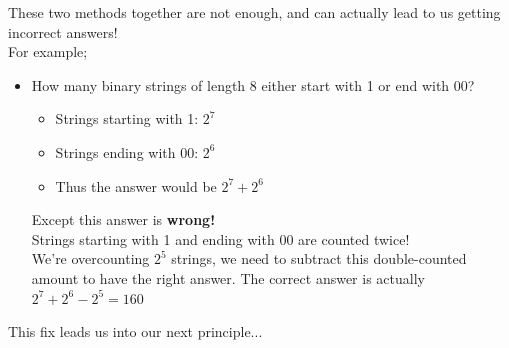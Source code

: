 \documentclass[12pt, letterpaper]{article}
\begin{document}
These two methods together are not enough, and can actually lead to us getting incorrect answers! \\ 
For example;
\begin{itemize}[leftmargin=*, label={}]
	\item How many binary strings of length 8 either start with 1 or end with 00?
	\begin{itemize}
		\item Strings starting with 1: $2^7$
		\item Strings ending with 00: $2^6$
		\item Thus the answer would be $2^7 + 2^6$
	\end{itemize}
	Except this answer is \textbf{wrong!} \\ Strings starting with 1 and ending with 00 are counted twice! \\
	We're overcounting $2^5$ strings, we need to subtract this double-counted amount to have the right answer. The correct answer is actually $2^7 + 2^6 - 2^5 = 160$
\end{itemize}

This fix leads us into our next principle... 
\end{document}

